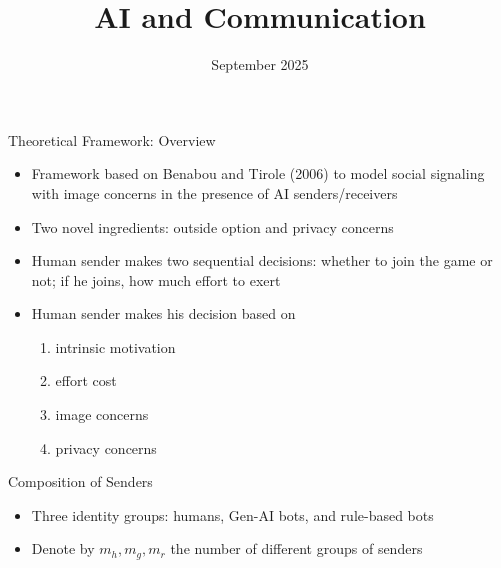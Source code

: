 \documentclass[11pt,aspectratio=169]{beamer}
\author[Ash, Lou, Song]{%
    \texorpdfstring{%
    \begin{columns}
        \column{.3333\linewidth}
        \centering
        Elliot Ash \\\vspace{.5em} \small ETH Zurich
        \column{.3333\linewidth}
        \centering
        Yichuan Lou \\\vspace{.5em} \small UTokyo
        \column{.3333\linewidth}
        \centering
        Lena Song \\\vspace{.5em} \small UIUC
    \end{columns}}{Elliot Ash, Yichuan Lou, Lena Song}
}
\title[AI and Communication]{AI and Communication}
\date[Conference Name]{September 2025}
\begin{document}
\begin{frame}[plain]
    \titlepage
\end{frame}




\begin{frame}{Theoretical Framework: Overview}

\begin{itemize}\setlength{\itemsep}{1em}
    \item Framework based on Benabou and Tirole (2006) to model social signaling with image concerns in the presence of AI senders/receivers
    \item Two novel ingredients: outside option and privacy concerns
    \item Human sender makes two sequential decisions: whether to join the game or not; if he joins, how much effort to exert
    \item Human sender makes his decision based on
    \begin{enumerate}
        \item intrinsic motivation
        \item effort cost
        \item image concerns
        \item privacy concerns
    \end{enumerate}
\end{itemize}
    
\end{frame}



\begin{frame}{Composition of Senders}

\begin{itemize}
    \item Three identity groups: humans, Gen-AI bots, and rule-based bots
    \item Denote by $m_h,m_g,m_r$ the number of different groups of senders 
\end{itemize}
    
\end{frame}
\end{document}
